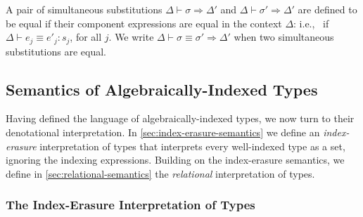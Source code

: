 
A pair of simultaneous substitutions $\Delta \vdash \sigma \Rightarrow
\Delta'$ and $\Delta \vdash \sigma' \Rightarrow \Delta'$ are defined
to be equal if their component expressions are equal in the context
$\Delta$: i.e.,~ if $\Delta \vdash e_j \equiv e'_j : s_j$, for all
$j$. We write $\Delta \vdash \sigma \equiv \sigma' \Rightarrow
\Delta'$ when two simultaneous substitutions are equal.

\subsection{Semantics of Algebraically-Indexed Types}
\label{sec:semantics-algebraically-indexed-types}

Having defined the language of algebraically-indexed types, we now
turn to their denotational interpretation. In
\autoref{sec:index-erasure-semantics} we define an
\emph{index-erasure} interpretation of types that interprets every
well-indexed type as a set, ignoring the indexing expressions. Building on
the index-erasure semantics, we define in
\autoref{sec:relational-semantics} the \emph{relational}
interpretation of types.


\subsubsection{The Index-Erasure Interpretation of Types}
\label{sec:index-erasure-semantics}

